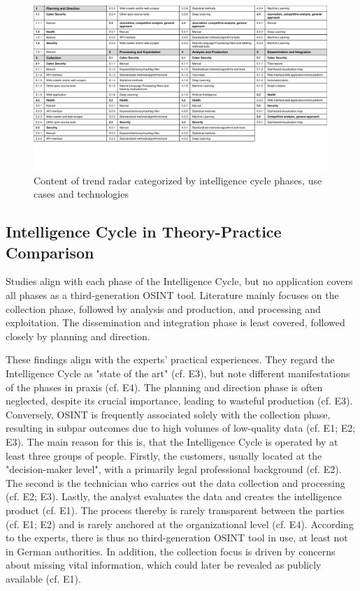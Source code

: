 \documentclass[10pt]{article}
\begin{document}
\begin{figure}[thb]
    \centering
    \includegraphics[width=0.99\textwidth]{PDF/images/crop_Trendradar explanation}
    \caption{Content of trend radar categorized by intelligence cycle phases, use cases and technologies}
    \label{fig:trendradarexplanation}
\end{figure}

\subsection{Intelligence Cycle in Theory-Practice Comparison}

Studies align with each phase of the Intelligence Cycle, but no application covers all phases as a third-generation OSINT tool. Literature mainly focuses on the collection phase, followed by analysis and production, and processing and exploitation. The dissemination and integration phase is least covered, followed closely by planning and direction.

These findings align with the experts' practical experiences. They regard the Intelligence Cycle as "state of the art" (cf. E3), but note different manifestations of the phases in praxis (cf. E4).
The planning and direction phase is often neglected, despite its crucial importance, leading to wasteful production (cf. E3). Conversely, OSINT is frequently associated solely with the collection phase,
resulting in subpar outcomes due to high volumes of low-quality data (cf. E1; E2; E3). The main reason for this is, that the Intelligence Cycle is operated by at least three groups of people. Firstly, the customers, usually located at the "decision-maker level", with a primarily legal professional background (cf. E2).
The second is the technician who carries out the data collection and processing (cf. E2; E3). Lastly, the analyst evaluates the data and creates the intelligence product (cf. E1). The process thereby is rarely transparent between the parties
(cf. E1; E2) and is rarely anchored at the organizational level (cf. E4). According to the experts, there is thus no third-generation
OSINT tool in use, at least not in German authorities. In addition, the collection focus is driven by concerns about missing vital information, which could later be revealed as publicly available (cf. E1).
\end{document}
